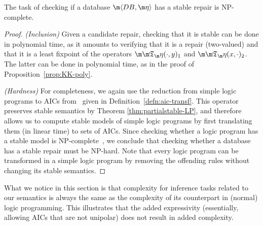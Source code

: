 \begin{proposition}\label{prop:stable-complexity}
  The task of checking if a database $\fulldb$ has a stable repair is NP-complete.
\end{proposition}
\begin{proof}
  \emph{(Inclusion)} Given a candidate repair, checking that it is stable can be done in polynomial time, as it amounts to verifying that it is a repair (two-valued) and that it is a least fixpoint of the operators $\Ap(\cdot,y)_1$ and $\Ap(x,\cdot)_2$.
  The latter can be done in polynomial time, as in the proof of Proposition~\ref{prop:KK-poly}.

  \emph{(Hardness)} For completeness, we again use the reduction from simple logic programs to AICs from~\cite{tplp/CaropreseT11} given in Definition~\ref{defn:aic-transf}.
  This operator preserves stable semantics by Theorem \ref{thm:partialstable-LP}, and therefore allows us to compute stable models of simple logic programs by first translating them (in linear time) to sets of AICs.
  Since checking whether a logic program has a stable model is NP-complete~\cite{tcs/BidoitF91,jacm/MarekT91}, we conclude that checking whether a database has a stable repair must be NP-hard.
  Note that every logic program can be transformed in a simple logic program by removing the offending rules without changing its stable semantics.
\end{proof}




What we notice in this section is that complexity for inference tasks related to our semantics is always the same as the complexity of its counterpart in (normal) logic programming. 
This illustrates that the added expressivity (essentially, allowing AICs that are not unipolar) does not result in added complexity. 

